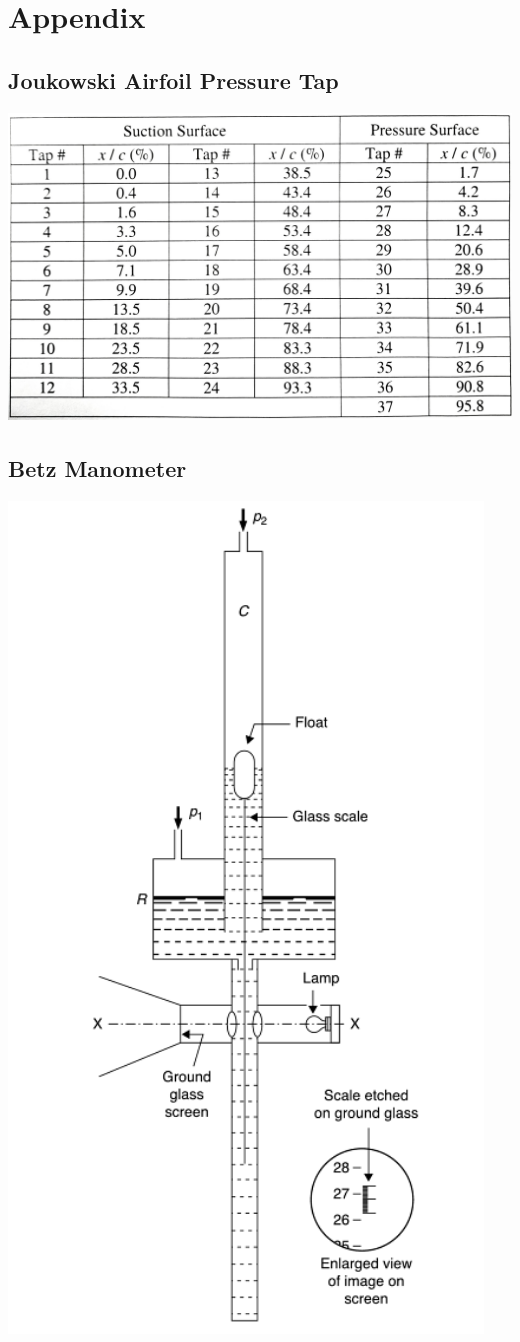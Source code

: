 \documentclass[paper=a4, fontsize=11pt, abstract=on]{scrartcl}
\numberwithin{equation}{section}		%
\numberwithin{figure}{section}			%
\numberwithin{table}{section}				%
\begin{document}
\newpage



\appendix
\section{Appendix} \label{App:Appendix}
\subsection{Joukowski Airfoil Pressure Tap}

\includegraphics[width=0.8\linewidth]{table}

\subsection{Betz Manometer}


\includegraphics[width=0.8\linewidth]{betz}
\end{document}
